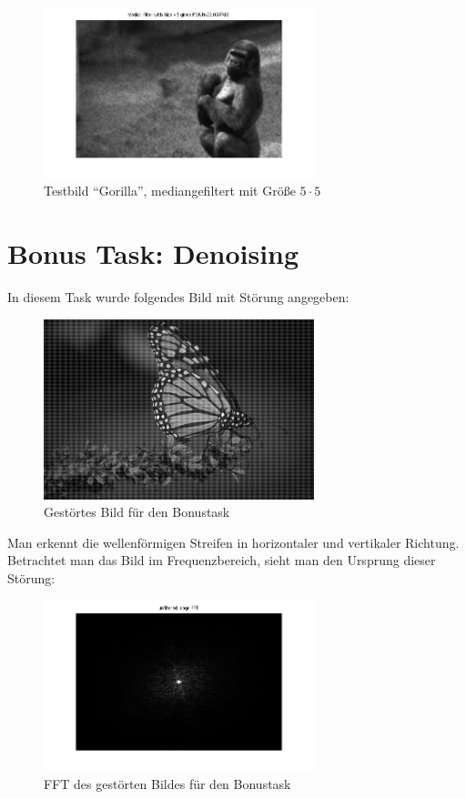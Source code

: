 \begin{figure}[htb]
 \centering
 \includegraphics[width=0.7\textwidth]{../images_out/t2_g_m5.png}
 \caption{Testbild ``Gorilla'', mediangefiltert mit Größe $5 \cdot 5$}
 \label{fig:t2_g_m5}
\end{figure}

\clearpage



\chapter{Bonus Task: Denoising}

In diesem Task wurde folgendes Bild mit Störung angegeben:

\begin{figure}[h!]
 \centering
 \includegraphics[width=0.7\textwidth]{../images/bonus.png}
 \caption{Gestörtes Bild für den Bonustask}
 \label{fig:b_original}
\end{figure}

Man erkennt die wellenförmigen Streifen in horizontaler und vertikaler Richtung. Betrachtet man das Bild im Frequenzbereich, sieht man den Ursprung dieser Störung:

\begin{figure}[h!]
 \centering
 \includegraphics[width=0.7\textwidth]{../images_out/b_unfiltered_fft.png}
 \caption{FFT des gestörten Bildes für den Bonustask}
 \label{fig:b_unfiltered_fft}
\end{figure}

